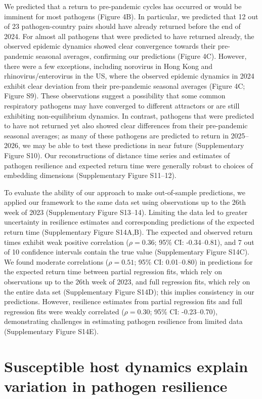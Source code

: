 \documentclass[12pt]{article}
\begin{document}
We predicted that a return to pre-pandemic cycles has occurred or would be imminent for most pathogens (Figure 4B).
In particular, we predicted that 12 out of 23 pathogen-country pairs should have already returned before the end of 2024.
For almost all pathogens that were predicted to have returned already, the observed epidemic dynamics showed clear convergence towards their pre-pandemic seasonal averages, confirming our predictions (Figure 4C).
However, there were a few exceptions, including norovirus in Hong Kong and rhinovirus/enterovirus in the US, where the observed epidemic dynamics in 2024 exhibit clear deviation from their pre-pandemic seasonal averages (Figure 4C; Figure S9).
These observations suggest a possibility that some common respiratory pathogens may have converged to different attractors or are still exhibiting non-equilibrium dynamics.
In contrast, pathogens that were predicted to have not returned yet also showed clear differences from their pre-pandemic seasonal averages; as many of these pathogens are predicted to return in 2025--2026, we may be able to test these predictions in near future (Supplementary Figure S10).
Our reconstructions of distance time series and estimates of pathogen resilience and expected return time were generally robust to choices of embedding dimensions (Supplementary Figure S11--12).

To evaluate the ability of our approach to make out-of-sample predictions, we applied our framework to the same data set using observations up to the 26th week of 2023 (Supplementary Figure S13--14).
Limiting the data led to greater uncertainty in resilience estimates and corresponding predictions of the expected return time (Supplementary Figure S14A,B).
The expected and observed return times exhibit weak positive correlation ($\rho=0.36$; 95\% CI: -0.34--0.81), and 7 out of 10 confidence intervals contain the true value (Supplementary Figure S14C).
We found moderate correlations ($\rho=0.51$; 95\% CI: 0.01--0.80) in predictions for the expected return time between partial regression fits, which rely on observations up to the 26th week of 2023, and full regression fits, which rely on the entire data set (Supplementary Figure S14D);
this implies consistency in our predictions.
However, resilience estimates from partial regression fits and full regression fits were weakly correlated ($\rho=0.30$; 95\% CI: -0.23--0.70), demonstrating challenges in estimating pathogen resilience from limited data (Supplementary Figure S14E).

\section*{Susceptible host dynamics explain variation in pathogen resilience}
\end{document}
